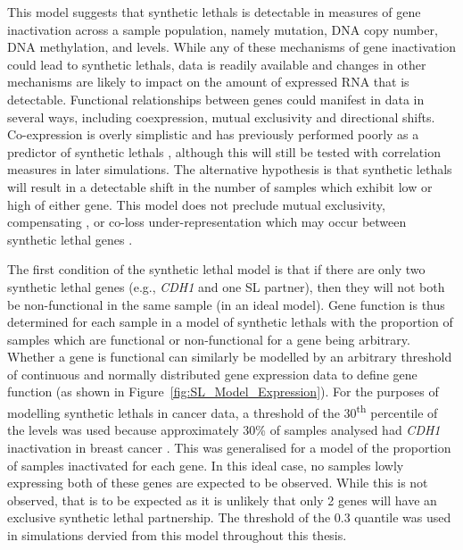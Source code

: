 This model suggests that \glspl{synthetic lethal} is detectable in measures of gene inactivation across a sample population, namely \gls{mutation}, \acrshort{DNA} copy number, \acrshort{DNA} \gls{methylation}, and  levels. While any of these mechanisms of gene inactivation could lead to \glspl{synthetic lethal},  data is readily available and changes in other mechanisms are likely to impact on the amount of expressed \acrshort{RNA} that is detectable. Functional relationships between genes could manifest in  data in several ways, including coexpression, mutual exclusivity and directional shifts. Co-expression is overly simplistic \citep{Lu2015} and has previously performed poorly as a predictor of \glspl{synthetic lethal} \citep{Jerby2014}, although this will still be tested with correlation measures in later simulations. The alternative hypothesis is that \glspl{synthetic lethal} will result in a detectable shift in the number of samples which exhibit low or high  of either gene. This model does not preclude mutual exclusivity, compensating , or co-loss under-representation which may occur between \gls{synthetic lethal} genes \citep{Wappett2016, Lu2015}. 

The first condition of the \gls{synthetic lethal} model is that if there are only two \gls{synthetic lethal} genes (e.g., \textit{CDH1} and one SL partner), then they will not both be non-functional in the same sample (in an ideal model). Gene function is thus determined for each sample in a model of \glspl{synthetic lethal} with the proportion of samples which are functional or non-functional for a gene being arbitrary. Whether a gene is functional can similarly be modelled by an arbitrary threshold of continuous and normally distributed \gls{gene expression} data to define gene function (as shown in Figure~\ref{fig:SL_Model_Expression}). For the purposes of modelling \glspl{synthetic lethal} in cancer  data, a threshold of the 30\textsuperscript{th} percentile of the  levels was used because approximately 30\% of samples analysed had \textit{CDH1} inactivation in breast cancer \citep{TCGA2012}. This was generalised for a model of the proportion of samples inactivated for each gene. In this ideal case, no samples lowly expressing both of these genes are expected to be observed. While this is not observed, that is to be expected as it is unlikely that only 2 genes will have an exclusive \gls{synthetic lethal} partnership. The threshold of the 0.3 quantile was used in simulations dervied from this model throughout this thesis.

